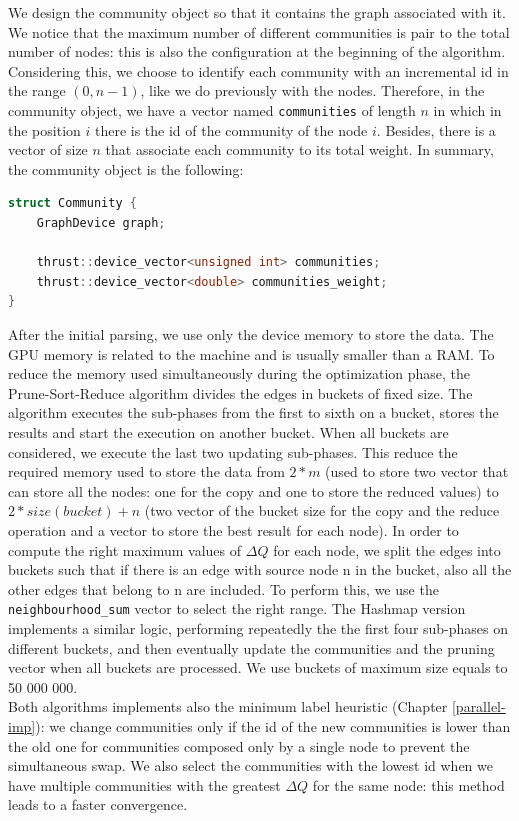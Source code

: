 We design the community object so that it contains the graph associated with it. We notice that the maximum number of different communities is pair to the total number of nodes: this is also the configuration at the beginning of the algorithm. Considering this, we choose to identify each community with an incremental id in the range $(0, n-1)$, like we do previously with the nodes. Therefore, in the community object, we have a vector named \verb|communities| of length $n$ in which in the position $i$ there is the id of the community of the node $i$. Besides, there is a vector of size $n$ that associate each community to its total weight.  In summary,  the community object is the following:
\begin{lstlisting}[language=C++]
struct Community {
	GraphDevice graph;
	
	thrust::device_vector<unsigned int> communities;
	thrust::device_vector<double> communities_weight;
}
\end{lstlisting}
After the initial parsing, we use only the device memory to store the data. The GPU memory is related to the machine and is usually smaller than a RAM.
To reduce the memory used simultaneously during the optimization phase, the Prune-Sort-Reduce algorithm divides the edges in buckets of fixed size. 
The algorithm executes the sub-phases from the first to sixth on a bucket, stores the results and start the execution on another bucket. When all buckets are considered, we execute the last two updating sub-phases. This reduce the required memory used to store the data from $2*m$ (used to store two vector that can store all the nodes: one for the copy and one to store the reduced values) to $2*size(bucket) + n$ (two vector of the bucket size for the copy and the reduce operation and a vector to store the best result for each node). 
In order to compute the right maximum values of $\Delta Q$ for each node, we split the edges into buckets such that if there is an edge with source node n in the bucket, also all the other edges that belong to n are included. To perform this, we use the \verb|neighbourhood_sum| vector to select the right range. The Hashmap version implements a similar logic, performing repeatedly the the first four sub-phases on different buckets,  and then eventually update the communities and the pruning vector when all buckets are processed. We use buckets of maximum size equals to 50 000 000.\\
Both algorithms implements also the minimum label heuristic (Chapter \ref{parallel-imp}): we change communities only if the id of the new communities is lower than the old one for communities composed only by a single node to prevent the simultaneous swap. We also select the communities with the lowest id when we have multiple communities with the greatest $\Delta Q$ for the same node: this method leads to a faster convergence.

